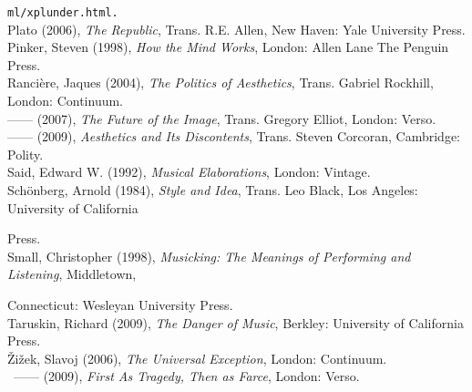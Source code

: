 \texttt{ml/xplunder.html.}\\
Plato (2006), \emph{The Republic}, Trans. R.E. Allen, New Haven: Yale University Press.\\
Pinker, Steven (1998), \emph{How the Mind Works}, London: Allen Lane The Penguin Press.\\
Ranci\`{e}re, Jaques (2004), \emph{The Politics of Aesthetics}, Trans. Gabriel Rockhill, London: Continuum. \\
------ (2007), \emph{The Future of the Image}, Trans. Gregory Elliot, London: Verso.\\
------ (2009), \emph{Aesthetics and Its Discontents}, Trans. Steven Corcoran, Cambridge: Polity.\\
Said, Edward W. (1992), \emph{Musical Elaborations}, London: Vintage.\\
Sch\"{o}nberg, Arnold (1984),  \emph{Style and Idea}, Trans. Leo Black, Los Angeles: University of California

Press.\\
Small, Christopher (1998), \emph{Musicking: The Meanings of Performing and Listening}, Middletown, 

Connecticut: Wesleyan University Press.\\
Taruskin, Richard (2009), \emph{The Danger of Music}, Berkley: University of California Press.\\
\v{Z}i\v{z}ek, Slavoj (2006), \emph{The Universal Exception}, London: Continuum.\\\
------ (2009), \emph{First As Tragedy, Then as Farce}, London: Verso.\\
